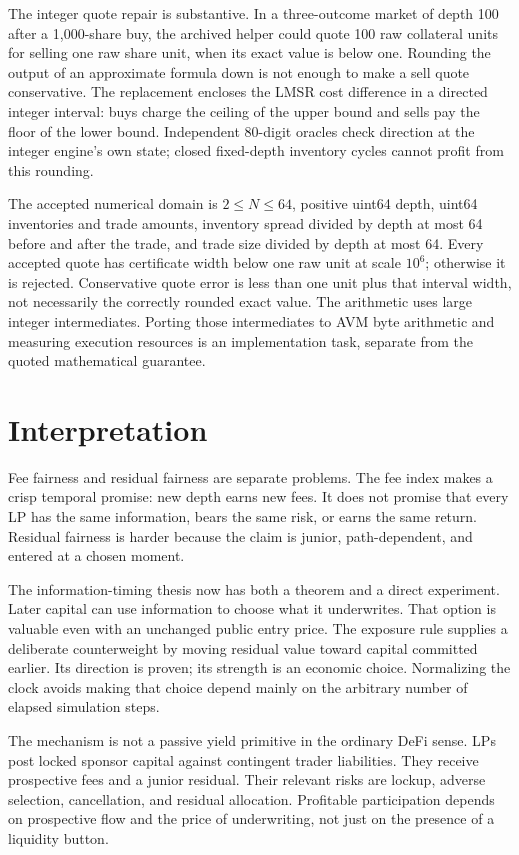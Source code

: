 \documentclass[10pt]{article}
\begin{document}
The integer quote repair is substantive. In a three-outcome market of depth 100 after a 1,000-share buy, the archived helper could quote 100 raw collateral units for selling one raw share unit, when its exact value is below one. Rounding the output of an approximate formula down is not enough to make a sell quote conservative. The replacement encloses the LMSR cost difference in a directed integer interval: buys charge the ceiling of the upper bound and sells pay the floor of the lower bound. Independent 80-digit oracles check direction at the integer engine's own state; closed fixed-depth inventory cycles cannot profit from this rounding.

The accepted numerical domain is $2\le N\le64$, positive uint64 depth, uint64 inventories and trade amounts, inventory spread divided by depth at most 64 before and after the trade, and trade size divided by depth at most 64. Every accepted quote has certificate width below one raw unit at scale $10^6$; otherwise it is rejected. Conservative quote error is less than one unit plus that interval width, not necessarily the correctly rounded exact value. The arithmetic uses large integer intermediates. Porting those intermediates to AVM byte arithmetic and measuring execution resources is an implementation task, separate from the quoted mathematical guarantee.

\section{Interpretation}

Fee fairness and residual fairness are separate problems. The fee index makes a crisp temporal promise: new depth earns new fees. It does not promise that every LP has the same information, bears the same risk, or earns the same return. Residual fairness is harder because the claim is junior, path-dependent, and entered at a chosen moment.

The information-timing thesis now has both a theorem and a direct experiment. Later capital can use information to choose what it underwrites. That option is valuable even with an unchanged public entry price. The exposure rule supplies a deliberate counterweight by moving residual value toward capital committed earlier. Its direction is proven; its strength is an economic choice. Normalizing the clock avoids making that choice depend mainly on the arbitrary number of elapsed simulation steps.

The mechanism is not a passive yield primitive in the ordinary DeFi sense. LPs post locked sponsor capital against contingent trader liabilities. They receive prospective fees and a junior residual. Their relevant risks are lockup, adverse selection, cancellation, and residual allocation. Profitable participation depends on prospective flow and the price of underwriting, not just on the presence of a liquidity button.
\end{document}
